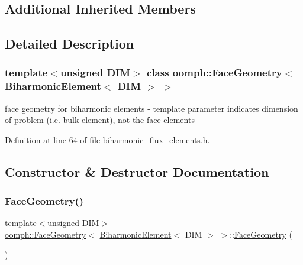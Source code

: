 \subsection*{Additional Inherited Members}


\subsection{Detailed Description}
\subsubsection*{template$<$unsigned D\+IM$>$\newline
class oomph\+::\+Face\+Geometry$<$ Biharmonic\+Element$<$ D\+I\+M $>$ $>$}

face geometry for biharmonic elements -\/ template parameter indicates dimension of problem (i.\+e. bulk element), not the face elements 

Definition at line 64 of file biharmonic\+\_\+flux\+\_\+elements.\+h.



\subsection{Constructor \& Destructor Documentation}
\mbox{\label{classoomph_1_1FaceGeometry_3_01BiharmonicElement_3_01DIM_01_4_01_4_a77c1e59f2132ac5d9bcef25f025448fe}} 
\subsubsection{\texorpdfstring{Face\+Geometry()}{FaceGeometry()}}
{\footnotesize\ttfamily template$<$unsigned D\+IM$>$ \\
\hyperlink{classoomph_1_1FaceGeometry}{oomph\+::\+Face\+Geometry}$<$ \hyperlink{classoomph_1_1BiharmonicElement}{Biharmonic\+Element}$<$ D\+IM $>$ $>$\+::\hyperlink{classoomph_1_1FaceGeometry}{Face\+Geometry} (\begin{DoxyParamCaption}{ }\end{DoxyParamCaption})\hspace{0.3cm}{\ttfamily [inline]}}



